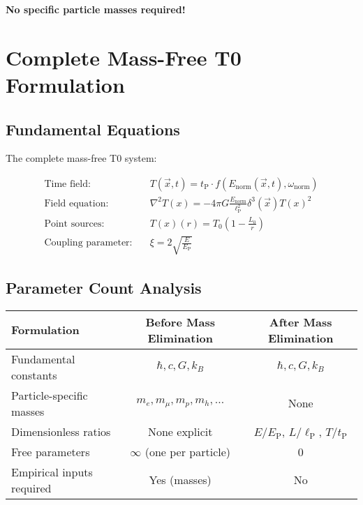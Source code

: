 \documentclass[12pt,a4paper]{article}
\newcommand{\Tfield}{T(x)}
\newcommand{\Tfieldt}{T(\vec{x},t)}
\newcommand{\Tzero}{T_0}
\newcommand{\vecx}{\vec{x}}
\newcommand{\lP}{\ell_{\text{P}}}
\newcommand{\tP}{t_{\text{P}}}
\newcommand{\EP}{E_{\text{P}}}
\newcommand{\xipar}{\xi}
\begin{document}
	\textbf{No specific particle masses required!}
	
	\section{Complete Mass-Free T0 Formulation}
	\label{sec:complete_formulation}
	
	\subsection{Fundamental Equations}
	\label{subsec:fundamental_equations}
	
	The complete mass-free T0 system:
	
	\begin{tcolorbox}[colback=blue!5!white,colframe=blue!75!black,title=Mass-Free T0 Model]
		\begin{align}
			\text{Time field:} \quad &\Tfieldt = \tP \cdot f(E_{\text{norm}}(\vecx,t), \omega_{\text{norm}}) \\
			\text{Field equation:} \quad &\nabla^2 \Tfield = -4\pi G \frac{E_{\text{norm}}}{\lP^2} \delta^3(\vecx) \Tfield^2 \\
			\text{Point sources:} \quad &\Tfield(r) = \Tzero\left(1 - \frac{L_0}{r}\right) \\
			\text{Coupling parameter:} \quad &\xipar = 2\sqrt{\frac{E}{\EP}}
		\end{align}
	\end{tcolorbox}
	
	\subsection{Parameter Count Analysis}
	\label{subsec:parameter_count}
	
	\begin{center}
		\begin{tabular}{|l|c|c|}
			\hline
			\textbf{Formulation} & \textbf{Before Mass Elimination} & \textbf{After Mass Elimination} \\
			\hline
			\hline
			Fundamental constants & $\hbar, c, G, k_B$ & $\hbar, c, G, k_B$ \\
			\hline
			Particle-specific masses & $m_e, m_\mu, m_p, m_h, \ldots$ & None \\
			\hline
			Dimensionless ratios & None explicit & $E/\EP$, $L/\lP$, $T/\tP$ \\
			\hline
			Free parameters & $\infty$ (one per particle) & 0 \\
			\hline
			Empirical inputs required & Yes (masses) & No \\
			\hline
		\end{tabular}
	\end{center}
	
\end{document}
